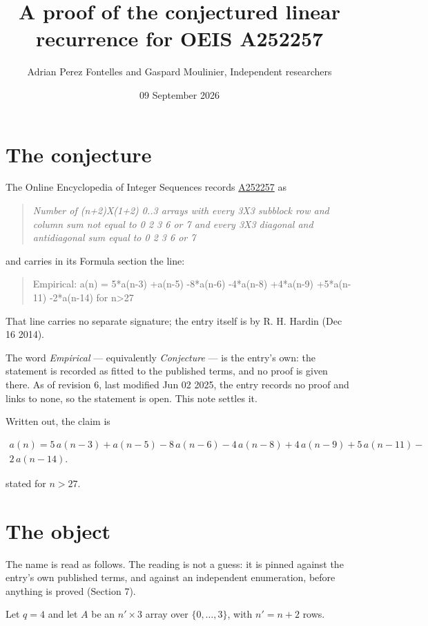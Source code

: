 \documentclass[11pt]{article}
\title{A proof of the conjectured linear recurrence for OEIS A252257}
\author{Adrian Perez Fontelles and Gaspard Moulinier, Independent researchers}
\date{09 September 2026}
\theoremstyle{definition}
\begin{document}
\maketitle
\section{The conjecture}

The Online Encyclopedia of Integer Sequences records \href{https://oeis.org/A252257}{A252257} as

\begin{quote}\itshape Number of (n+2)X(1+2) 0..3 arrays with every 3X3 subblock row and column sum not equal to 0 2 3 6 or 7 and every 3X3 diagonal and antidiagonal sum equal to 0 2 3 6 or 7\end{quote}

and carries in its Formula section the line:

\begin{quote}\ttfamily Empirical: a(n) = 5*a(n-3) +a(n-5) -8*a(n-6) -4*a(n-8) +4*a(n-9) +5*a(n-11) -2*a(n-14) for n>27\end{quote}

That line carries no separate signature; the entry itself is by R. H. Hardin (Dec 16 2014).

The word {\itshape Empirical} --- equivalently {\itshape Conjecture} --- is the entry's own: the statement is recorded as fitted to the published terms, and no proof is given there. As of revision 6, last modified Jun 02 2025, the entry records no proof and links to none, so the statement is open. This note settles it.

Written out, the claim is

\begin{multline*} a(n) = 5\,a(n-3) + a(n-5) - 8\,a(n-6) - 4\,a(n-8) + 4\,a(n-9) + 5\,a(n-11) - \\ 2\,a(n-14). \end{multline*}

stated for $n > 27$.

\section{The object}

The name is read as follows. The reading is not a guess: it is pinned against the entry's own published terms, and against an independent enumeration, before anything is proved (Section 7).

Let $q = 4$ and let $A$ be an $n' \times 3$ array over $\{0,\dots,3\}$, with $n' = n + 2$ rows.
\end{document}

